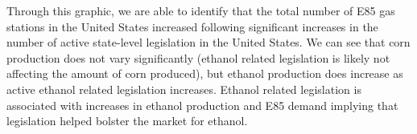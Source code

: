 \documentclass[
]{article}
\begin{document}
Through this graphic, we are able to identify that the total number of
E85 gas stations in the United States increased following significant
increases in the number of active state-level legislation in the United
States. We can see that corn production does not vary significantly
(ethanol related legislation is likely not affecting the amount of corn
produced), but ethanol production does increase as active ethanol
related legislation increases. Ethanol related legislation is associated
with increases in ethanol production and E85 demand implying that
legislation helped bolster the market for ethanol.
\end{document}
